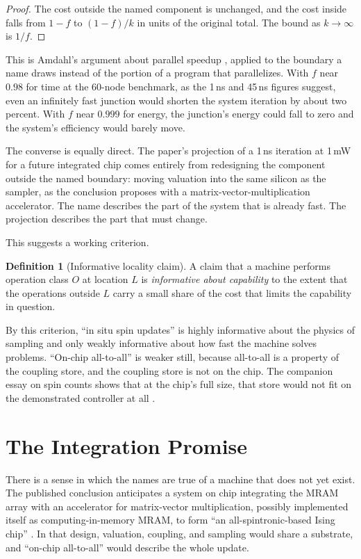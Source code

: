 \documentclass[11pt]{article}
\theoremstyle{definition}
\newtheorem{definition}{Definition}
\theoremstyle{remark}
\begin{document}
\begin{proof}
The cost outside the named component is unchanged, and the cost inside falls from $1 - f$ to $(1-f)/k$ in units of the original total. The bound as $k \to \infty$ is $1/f$.
\end{proof}

This is Amdahl's argument about parallel speedup \cite{amdahl1967}, applied to the boundary a name draws instead of the portion of a program that parallelizes. With $f$ near $0.98$ for time at the 60-node benchmark, as the 1\,ns and 45\,ns figures suggest, even an infinitely fast junction would shorten the system iteration by about two percent. With $f$ near $0.999$ for energy, the junction's energy could fall to zero and the system's efficiency would barely move.

The converse is equally direct. The paper's projection of a 1\,ns iteration at 1\,mW for a future integrated chip \cite{li2026} comes entirely from redesigning the component outside the named boundary: moving valuation into the same silicon as the sampler, as the conclusion proposes with a matrix-vector-multiplication accelerator. The name describes the part of the system that is already fast. The projection describes the part that must change.

This suggests a working criterion.

\begin{definition}[Informative locality claim]
A claim that a machine performs operation class $O$ at location $L$ is \emph{informative about capability} to the extent that the operations outside $L$ carry a small share of the cost that limits the capability in question.
\end{definition}

By this criterion, ``in situ spin updates'' is highly informative about the physics of sampling and only weakly informative about how fast the machine solves problems. ``On-chip all-to-all'' is weaker still, because all-to-all is a property of the coupling store, and the coupling store is not on the chip. The companion essay on spin counts shows that at the chip's full size, that store would not fit on the demonstrated controller at all \cite{flyxion-spincount}.

\section{The Integration Promise}

There is a sense in which the names are true of a machine that does not yet exist. The published conclusion anticipates a system on chip integrating the MRAM array with an accelerator for matrix-vector multiplication, possibly implemented itself as computing-in-memory MRAM, to form ``an all-spintronic-based Ising chip'' \cite{li2026}. In that design, valuation, coupling, and sampling would share a substrate, and ``on-chip all-to-all'' would describe the whole update.
\end{document}
